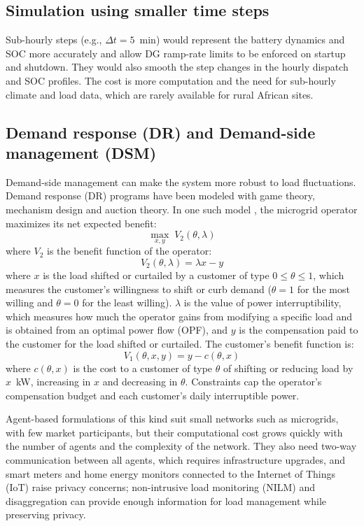 \documentclass[final,3p,times]{elsarticle}
\begin{document}
\subsection{Simulation using smaller time steps}

Sub-hourly steps (e.g., $\Delta t = 5$~min) would represent the battery dynamics and SOC more accurately and allow DG ramp-rate limits to be enforced on startup and shutdown. They would also smooth the step changes in the hourly dispatch and SOC profiles. The cost is more computation and the need for sub-hourly climate and load data, which are rarely available for rural African sites.

\subsection{\label{sec:dr} Demand response (DR) and Demand-side management (DSM)}

Demand-side management can make the system more robust to load fluctuations. Demand response (DR) programs have been modeled with game theory, mechanism design and auction theory. In one such model \cite{nwulu2017}, the microgrid operator maximizes its net expected benefit:
\begin{equation}
    \max_{x,y} \; V_2 (\theta, \lambda)
\end{equation}
where $V_2$ is the benefit function of the operator:
\begin{equation}
    V_2 (\theta, \lambda) = \lambda x - y
\end{equation}
where $x$ is the load shifted or curtailed by a customer of type $0 \leq \theta \leq 1$, which measures the customer's willingness to shift or curb demand ($\theta = 1$ for the most willing and $\theta = 0$ for the least willing). $\lambda$ is the value of power interruptibility, which measures how much the operator gains from modifying a specific load and is obtained from an optimal power flow (OPF), and $y$ is the compensation paid to the customer for the load shifted or curtailed. The customer's benefit function is:
\begin{equation}
    V_1(\theta,x,y) = y - c(\theta,x)
\end{equation}
where $c(\theta,x)$ is the cost to a customer of type $\theta$ of shifting or reducing load by $x$~kW, increasing in $x$ and decreasing in $\theta$. Constraints cap the operator's compensation budget and each customer's daily interruptible power.

Agent-based formulations of this kind suit small networks such as microgrids, with few market participants, but their computational cost grows quickly with the number of agents and the complexity of the network. They also need two-way communication between all agents, which requires infrastructure upgrades, and smart meters and home energy monitors connected to the Internet of Things (IoT) raise privacy concerns; non-intrusive load monitoring (NILM) and disaggregation can provide enough information for load management while preserving privacy.
\end{document}
